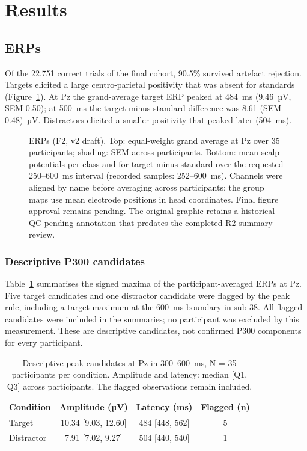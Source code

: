 \section{Results}
\label{ch:results}

\subsection{ERPs}
\label{sec:res-erp}
\label{sec:res-preproc}
Of the 22,751 correct trials of the final cohort, 90.5\% survived artefact rejection. Targets elicited a large centro-parietal positivity that was absent for standards (Figure~\ref{fig:erp}). At Pz the grand-average target ERP peaked at 484~ms (9.46~µV, SEM 0.50); at 500~ms the target-minus-standard difference was 8.61 (SEM 0.48)~µV. Distractors elicited a smaller positivity that peaked later (504~ms).

\begin{figure}[H]
\centering
{}
\caption{ERPs (F2, v2 draft). Top: equal-weight grand average at Pz over 35 participants; shading: SEM across participants. Bottom: mean scalp potentials per class and for target minus standard over the requested 250--600~ms interval (recorded samples: 252--600~ms). Channels were aligned by name before averaging across participants; the group maps use mean electrode positions in head coordinates. Final figure approval remains pending. The original graphic retains a historical QC-pending annotation that predates the completed R2 summary review.}
\label{fig:erp}
\end{figure}

\subsubsection{Descriptive P300 candidates}
\label{sec:p300-candidates}
Table~\ref{tab:p300-candidates} summarises the signed maxima of the participant-averaged ERPs at Pz. Five target candidates and one distractor candidate were flagged by the peak rule, including a target maximum at the 600~ms boundary in sub-38. All flagged candidates were included in the summaries; no participant was excluded by this measurement. These are descriptive candidates, not confirmed P300 components for every participant.

\begin{table}[H]
\centering
\small
\caption{Descriptive peak candidates at Pz in 300--600~ms, N = 35 participants per condition. Amplitude and latency: median [Q1, Q3] across participants. The flagged observations remain included.}
\label{tab:p300-candidates}
\begin{tabular}{lccc}
\toprule
\textbf{Condition} & \textbf{Amplitude (µV)} & \textbf{Latency (ms)} & \textbf{Flagged (n)} \\
\midrule
Target & 10.34 [9.03, 12.60] & 484 [448, 562] & 5 \\
Distractor & 7.91 [7.02, 9.27] & 504 [440, 540] & 1 \\
\bottomrule
\end{tabular}
\end{table}

